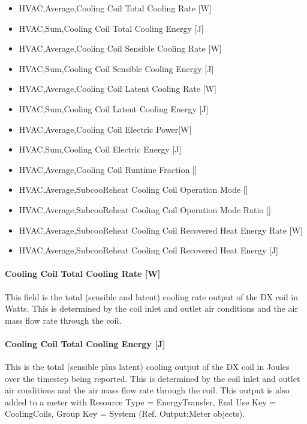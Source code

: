 \begin{itemize}
\item
  HVAC,Average,Cooling Coil Total Cooling Rate {[}W{]}
\item
  HVAC,Sum,Cooling Coil Total Cooling Energy {[}J{]}
\item
  HVAC,Average,Cooling Coil Sensible Cooling Rate {[}W{]}
\item
  HVAC,Sum,Cooling Coil Sensible Cooling Energy {[}J{]}
\item
  HVAC,Average,Cooling Coil Latent Cooling Rate {[}W{]}
\item
  HVAC,Sum,Cooling Coil Latent Cooling Energy {[}J{]}
\item
  HVAC,Average,Cooling Coil Electric Power{[}W{]}
\item
  HVAC,Sum,Cooling Coil Electric Energy {[}J{]}
\item
  HVAC,Average,Cooling Coil Runtime Fraction {[]}
\item
  HVAC,Average,SubcooReheat Cooling Coil Operation Mode {[]}
\item
  HVAC,Average,SubcooReheat Cooling Coil Operation Mode Ratio {[]}
\item
  HVAC,Average,SubcooReheat Cooling Coil Recovered Heat Energy Rate {[}W{]}
\item
  HVAC,Average,SubcooReheat Cooling Coil Recovered Heat Energy {[}J{]}
\end{itemize}

\paragraph{Cooling Coil Total Cooling Rate {[}W{]}}\label{cooling-coil-total-cooling-rate-w}

This field is the total (sensible and latent) cooling rate output of the DX coil in Watts. This is determined by the coil inlet and outlet air conditions and the air mass flow rate through the coil.

\paragraph{Cooling Coil Total Cooling Energy {[}J{]}}\label{cooling-coil-total-cooling-energy-j}

This is the total (sensible plus latent) cooling output of the DX coil in Joules over the timestep being reported. This is determined by the coil inlet and outlet air conditions and the air mass flow rate through the coil. This output is also added to a meter with Resource Type = EnergyTransfer, End Use Key = CoolingCoils, Group Key = System (Ref. Output:Meter objects).

